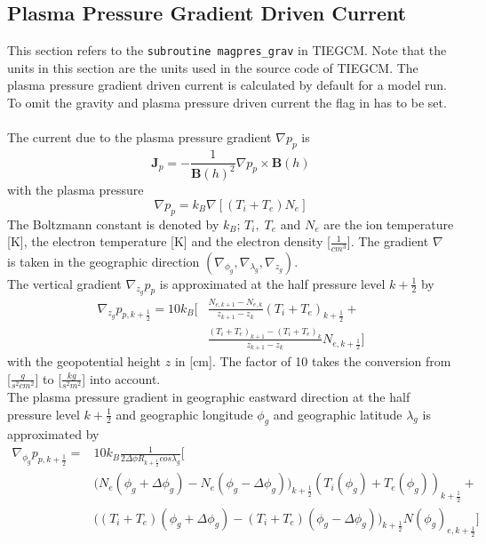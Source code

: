 \subsection{Plasma Pressure Gradient Driven Current}\label{subsec:ppres_current}
%
This section refers to the \texttt{subroutine magpres\_grav} in TIEGCM. Note that
the units in this section are the units used in the source code of
TIEGCM. The plasma pressure gradient driven current is calculated by default for a model run.
To omit the gravity and plasma pressure driven current the flag  in  
has to be set. \\ \\
%
The current due to the plasma pressure gradient $\nabla p_p$ is
%
\begin{equation}
  \mathbf{J}_p  =  - \frac{1}{\mathbf{B}(h)^2}\nabla p_p \times \mathbf{B}(h) 
  		\label{eq:j_p}
\end{equation}
%
with the plasma pressure
%
\begin{equation}
  \nabla p_p  =  k_B \nabla [(T_i + T_e ) N_e] \label{eq:gradp_p}
\end{equation}
%
The Boltzmann constant is denoted by $k_B$; $T_i , \; T_e$ and $N_e$ are the ion
temperature [K], the electron temperature [K] and the electron density
[$\frac{1}{cm^3}$]. The gradient $\nabla$ is taken in the geographic direction
$(\nabla_{\phi_g}, \nabla_{\lambda_g}, \nabla_{z_g})$. \\
%
The vertical gradient $\nabla_{z_g} p_p$ is
approximated at the half pressure level $k+\frac{1}{2}$ by
%
\begin{equation}
  \begin{split}
     \nabla_{z_g} p_{p,k+\frac{1}{2}}  =  10 k_B \biggl[  
   &  \frac{N_{e,k+1}-N_{e,k}}{z_{k+1}-z_{k}} (T_i+T_e)_{k+\frac{1}{2}} + \\
   & \frac{(T_i+T_e)_{k+1} - (T_i+T_e)_{k}}{z_{k+1}-z_{k}} N_{e, k+\frac{1}{2}}  \biggr]
  \end{split}
    \label{eq:gradz_pp}
\end{equation}
%
with the geopotential height $z$ in [cm].
The factor of 10 takes the conversion from [$\frac{g}{s^2 cm^2}$] to  [$\frac{kg}{s^2
m^2}$] into account. \\
%
The plasma pressure gradient in geographic eastward direction at the half pressure 
level $k+\frac{1}{2}$ and geographic longitude $\phi_g$ and geographic latitude
$\lambda_g$ is approximated by
%
\begin{equation}
  \begin{split}
     \nabla_{\phi_g} p_{p,k+\frac{1}{2}}  = & 10 k_B 
        \frac{1}{2 \Delta \phi R_{k+\frac{1}{2}} cos\lambda_g}
         \biggl[  \\
     & \bigl( N_e(\phi_g + \Delta \phi_g ) - N_e(\phi_g -\Delta \phi_g) \bigr)_{k+\frac{1}{2}} 
       (T_i(\phi_g)+T_e(\phi_g))_{k+\frac{1}{2}}  + \\
     & \bigl((T_i+T_e)(\phi_g + \Delta \phi_g )- (T_i+T_e)(\phi_g -\Delta \phi_g) \bigr)_{k+\frac{1}{2}} N(\phi_g)_{e, k+\frac{1}{2}} \biggr]
  \end{split}
  \label{eq:gradphi_pp}
\end{equation}
